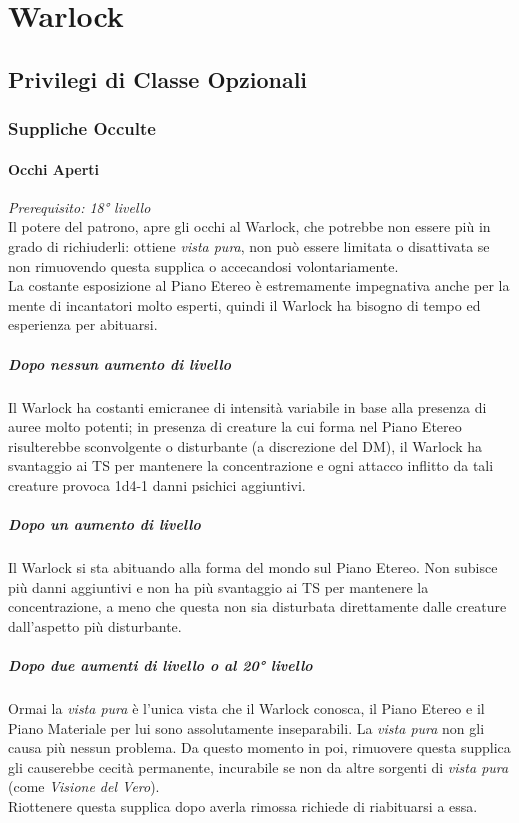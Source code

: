 \chapter{Warlock}

\section{Privilegi di Classe Opzionali}

\subsection{Suppliche Occulte}

\subsubsection{Occhi Aperti}
\textit{Prerequisito: 18° livello} \\ Il potere del patrono, apre gli occhi al Warlock, che potrebbe non essere più in grado di richiuderli: ottiene \textit{vista pura}, non può essere limitata o disattivata se non rimuovendo questa supplica o accecandosi volontariamente. \\
La costante esposizione al Piano Etereo è estremamente impegnativa anche per la mente di incantatori molto esperti, quindi il Warlock ha bisogno di tempo ed esperienza per abituarsi.
\paragraph{Dopo nessun aumento di livello}Il Warlock ha costanti emicranee di intensità variabile in base alla presenza di auree molto potenti; in presenza di creature la cui forma nel Piano Etereo risulterebbe sconvolgente o disturbante (a discrezione del DM), il Warlock ha svantaggio ai TS per mantenere la concentrazione e ogni attacco inflitto da tali creature provoca 1d4-1 danni psichici aggiuntivi.
\paragraph{Dopo un aumento di livello}Il Warlock si sta abituando alla forma del mondo sul Piano Etereo. Non subisce più danni aggiuntivi e non ha più svantaggio ai TS per mantenere la concentrazione, a meno che questa non sia disturbata direttamente dalle creature dall'aspetto più disturbante.
\paragraph{Dopo due aumenti di livello o al 20° livello} Ormai la \textit{vista pura} è l'unica vista che il Warlock conosca, il Piano Etereo e il Piano Materiale per lui sono assolutamente inseparabili. La \textit{vista pura} non gli causa più nessun problema. Da questo momento in poi, rimuovere questa supplica gli causerebbe cecità permanente, incurabile se non da altre sorgenti di \textit{vista pura} (come \textit{Visione del Vero}). \\
Riottenere questa supplica dopo averla rimossa richiede di riabituarsi a essa.

